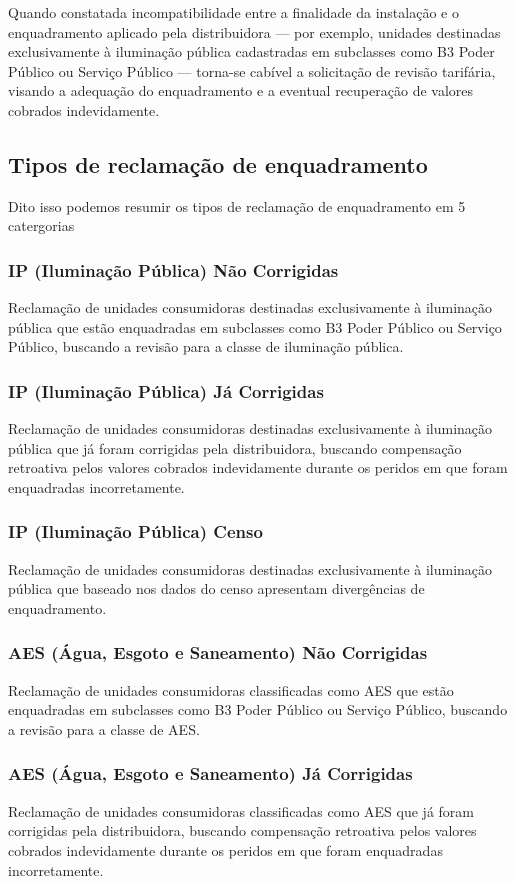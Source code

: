 \documentclass[12pt,a4paper]{article}
\begin{document}
Quando constatada incompatibilidade entre a finalidade da instalação e o enquadramento aplicado pela distribuidora — por exemplo, unidades destinadas exclusivamente à iluminação pública cadastradas em subclasses como B3 Poder Público ou Serviço Público — torna-se cabível a solicitação de revisão tarifária, visando a adequação do enquadramento e a eventual recuperação de valores cobrados indevidamente.

\subsection{Tipos de reclamação de enquadramento}
 Dito isso podemos resumir os tipos de reclamação de enquadramento em 5 catergorias

\subsubsection{IP (Iluminação Pública) Não Corrigidas}
    Reclamação de unidades consumidoras destinadas exclusivamente à iluminação pública que estão enquadradas em subclasses como B3 Poder Público ou Serviço Público, buscando a revisão para a classe de iluminação pública.
\subsubsection{IP (Iluminação Pública) Já Corrigidas}
    Reclamação de unidades consumidoras destinadas exclusivamente à iluminação pública que já foram corrigidas pela distribuidora, buscando compensação retroativa pelos valores cobrados indevidamente durante os peridos em que foram enquadradas incorretamente.
\subsubsection{IP (Iluminação Pública) Censo}
    Reclamação de unidades consumidoras destinadas exclusivamente à iluminação pública que baseado nos dados do censo apresentam divergências de enquadramento.
\subsubsection{AES (Água, Esgoto e Saneamento) Não Corrigidas}
    Reclamação de unidades consumidoras classificadas como AES que estão enquadradas em subclasses como B3 Poder Público ou Serviço Público, buscando a revisão para a classe de AES.
\subsubsection{AES (Água, Esgoto e Saneamento) Já Corrigidas}
    Reclamação de unidades consumidoras classificadas como AES que já foram corrigidas pela distribuidora, buscando compensação retroativa pelos valores cobrados indevidamente durante os peridos em que foram enquadradas incorretamente.
\end{document}
